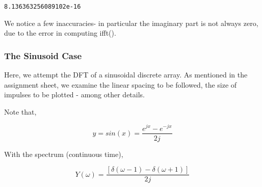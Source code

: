 \documentclass[11pt]{article}
\begin{document}
    
    \begin{Verbatim}[commandchars=\\\{\}]
8.136363256089102e-16

    \end{Verbatim}

    We notice a few inaccuracies- in particular the imaginary part is not
always zero, due to the error in computing ifft().

    \subsubsection{The Sinusoid Case}\label{the-sinusoid-case}

Here, we attempt the DFT of a sinusoidal discrete array. As mentioned in
the assignment sheet, we examine the linear spacing to be followed, the
size of impulses to be plotted - among other details.

Note that,

\[ y = sin(x) = \frac{e^{jx} −e^{-jx}}{2j} \]

With the spectrum (continuous time),

\[ Y(\omega)= \frac{[\delta(\omega−1)−\delta(\omega+1)]}{2j} \]
\end{document}

